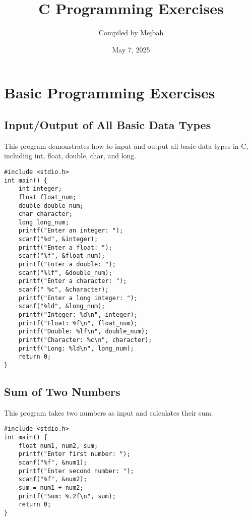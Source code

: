 \documentclass[a4paper,12pt]{article}
\title{C Programming Exercises}
\author{Compiled by Mejbah}
\date{May 7, 2025}
\begin{document}
\maketitle

\tableofcontents
\newpage

\section{Basic Programming Exercises}

\subsection{Input/Output of All Basic Data Types}
This program demonstrates how to input and output all basic data types in C, including int, float, double, char, and long.

\begin{lstlisting}[caption={Input/Output of All Basic Data Types}]
#include <stdio.h>
int main() {
    int integer;
    float float_num;
    double double_num;
    char character;
    long long_num;
    printf("Enter an integer: ");
    scanf("%d", &integer);
    printf("Enter a float: ");
    scanf("%f", &float_num);
    printf("Enter a double: ");
    scanf("%lf", &double_num);
    printf("Enter a character: ");
    scanf(" %c", &character);
    printf("Enter a long integer: ");
    scanf("%ld", &long_num);
    printf("Integer: %d\n", integer);
    printf("Float: %f\n", float_num);
    printf("Double: %lf\n", double_num);
    printf("Character: %c\n", character);
    printf("Long: %ld\n", long_num);
    return 0;
}
\end{lstlisting}

\newpage

\subsection{Sum of Two Numbers}
This program takes two numbers as input and calculates their sum.

\begin{lstlisting}[caption={Sum of Two Numbers}]
#include <stdio.h>
int main() {
    float num1, num2, sum;
    printf("Enter first number: ");
    scanf("%f", &num1);
    printf("Enter second number: ");
    scanf("%f", &num2);
    sum = num1 + num2;
    printf("Sum: %.2f\n", sum);
    return 0;
}
\end{lstlisting}
\end{document}
